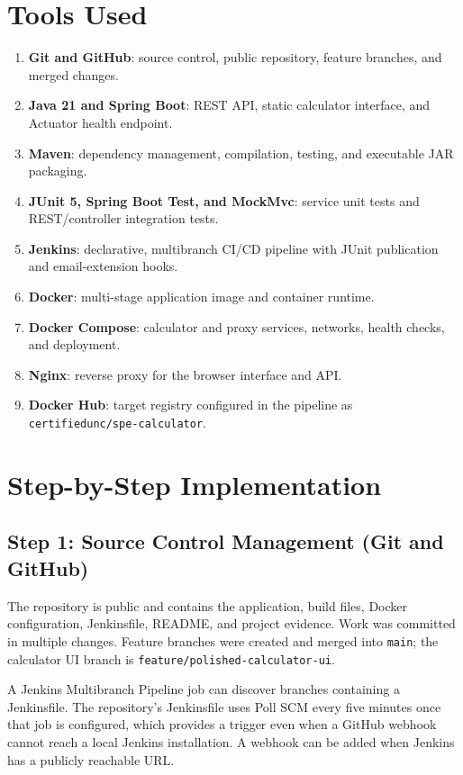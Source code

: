 \documentclass[11pt,a4paper]{article}
\begin{document}
\section{Tools Used}
\begin{enumerate}[leftmargin=*,itemsep=2pt]
  \item \textbf{Git and GitHub}: source control, public repository, feature branches, and merged changes.
  \item \textbf{Java 21 and Spring Boot}: REST API, static calculator interface, and Actuator health endpoint.
  \item \textbf{Maven}: dependency management, compilation, testing, and executable JAR packaging.
  \item \textbf{JUnit 5, Spring Boot Test, and MockMvc}: service unit tests and REST/controller integration tests.
  \item \textbf{Jenkins}: declarative, multibranch CI/CD pipeline with JUnit publication and email-extension hooks.
  \item \textbf{Docker}: multi-stage application image and container runtime.
  \item \textbf{Docker Compose}: calculator and proxy services, networks, health checks, and deployment.
  \item \textbf{Nginx}: reverse proxy for the browser interface and API.
  \item \textbf{Docker Hub}: target registry configured in the pipeline as \texttt{certifiedunc/spe-calculator}.
\end{enumerate}

\section{Step-by-Step Implementation}
\subsection{Step 1: Source Control Management (Git and GitHub)}
The repository is public and contains the application, build files, Docker configuration, Jenkinsfile, README, and project evidence. Work was committed in multiple changes. Feature branches were created and merged into \texttt{main}; the calculator UI branch is \texttt{feature/polished-calculator-ui}.

A Jenkins Multibranch Pipeline job can discover branches containing a Jenkinsfile. The repository's Jenkinsfile uses Poll SCM every five minutes once that job is configured, which provides a trigger even when a GitHub webhook cannot reach a local Jenkins installation. A webhook can be added when Jenkins has a publicly reachable URL.
\end{document}
